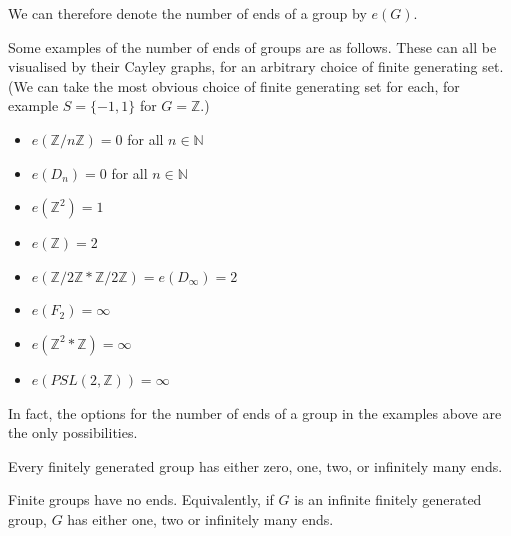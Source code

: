 We can therefore denote the number of ends of a group by \(e(G)\). 

\begin{example}
    Some examples of the number of ends of groups are as follows. These can all be visualised by their Cayley graphs, for an arbitrary choice of finite generating set. (We can take the most obvious choice of finite generating set for each, for example \(S = \{-1,1\}\) for \(G = \mathbb{Z}\).)
    \begin{multicols}{2}
    \begin{itemize}
        \item \(e(\mathbb{Z}/n\mathbb{Z}) = 0\) for all \(n \in \mathbb{N}\)
        \item \(e(D_n) = 0\) for all \(n \in \mathbb{N}\)
        \item \(e(\mathbb{Z}^2) = 1\)
        \item \(e(\mathbb{Z}) = 2\)
    \end{itemize}
    
        \columnbreak
        
    \begin{itemize}
        \item \(e(\mathbb{Z}/2\mathbb{Z} * \mathbb{Z}/2\mathbb{Z}) = e(D_{\infty}) = 2\)
        \item \(e(F_2) = \infty\)
        \item \(e(\mathbb{Z}^2 * \mathbb{Z}) = \infty\)
        \item \(e(PSL(2,\mathbb{Z})) = \infty\)
    \end{itemize}
    \end{multicols}
\end{example}

In fact, the options for the number of ends of a group in the examples above are the only possibilities.

\begin{theorem} \cite[p.~146--147]{bridson_haefliger_metric_1999}
\label{FH}
    Every finitely generated group has either zero, one, two, or infinitely many ends.
\end{theorem}

\begin{corollary}
    Finite groups have no ends. Equivalently, if \(G\) is an infinite finitely generated group, \(G\) has either one, two or infinitely many ends.
\end{corollary}

